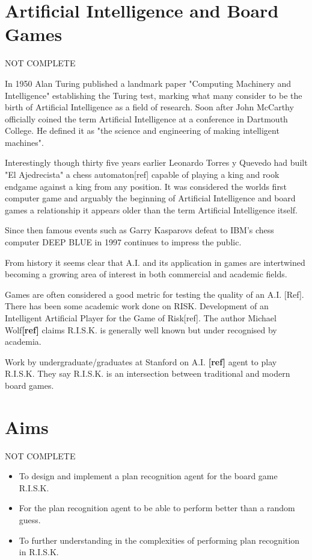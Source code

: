 \documentclass[parskip]{cs4rep}
\begin{document}
\section{Artificial Intelligence and Board Games}

NOT COMPLETE

In 1950 Alan Turing published a landmark paper "Computing Machinery and Intelligence" establishing the Turing test, marking what many consider to be the birth of Artificial Intelligence as a field of research. Soon after John McCarthy officially coined the term Artificial Intelligence at a conference in Dartmouth College. He defined it as "the science and engineering of making intelligent machines".

Interestingly though thirty five years earlier Leonardo Torres y Quevedo had built "El Ajedrecista" a chess automaton[ref] capable of playing a king and rook endgame against a king from any position. It was considered the worlds first computer game and arguably the beginning of Artificial Intelligence and board games a relationship it appears older than the term Artificial Intelligence itself. 

Since then famous events such as Garry Kasparovs defeat to IBM's chess computer DEEP BLUE in 1997 continues to impress the public. 

From history it seems clear that A.I. and its application in games are intertwined becoming a growing area of interest in both commercial and academic fields.

Games are often considered a good metric for testing the quality of an A.I. [Ref]. There has been some academic work done on RISK. Development of an Intelligent Artificial Player for the Game of Risk[ref]. The author Michael Wolf\textbf{[ref]} claims R.I.S.K. is generally well known but under recognised by academia.

Work by undergraduate/graduates at Stanford on A.I. \textbf{[ref]} agent to play R.I.S.K. They say R.I.S.K. is an intersection between traditional and modern board games.

\section{Aims}

NOT COMPLETE

\begin{itemize}
\item
To design and implement a plan recognition agent for the board game R.I.S.K.
\item
For the plan recognition agent to be able to perform better than a random guess.
\item
To further understanding in the complexities of performing plan recognition in R.I.S.K.
\end{itemize}
\end{document}

